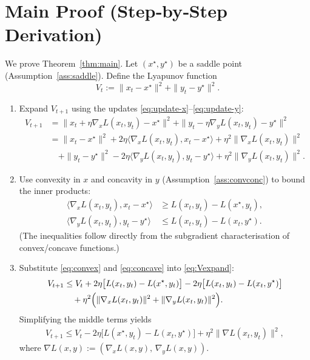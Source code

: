 \documentclass[11pt]{article}
\begin{document}
\section*{Main Proof (Step‑by‑Step Derivation)}
We prove Theorem~\ref{thm:main}. Let $(x^{\star},y^{\star})$ be a saddle point (Assumption~\ref{ass:saddle}). Define the Lyapunov function
\[
V_{t}:=\|x_{t}-x^{\star}\|^{2}+\|y_{t}-y^{\star}\|^{2}.
\]

\begin{enumerate}
\item[Step 1.] Expand $V_{t+1}$ using the updates \eqref{eq:update-x}–\eqref{eq:update-y}:
\begin{align}
V_{t+1}&=\|x_{t}+\eta\nabla_{x}L(x_{t},y_{t})-x^{\star}\|^{2}
        +\|y_{t}-\eta\nabla_{y}L(x_{t},y_{t})-y^{\star}\|^{2}\nonumber\\
&= \|x_{t}-x^{\star}\|^{2}+2\eta\langle \nabla_{x}L(x_{t},y_{t}),x_{t}-x^{\star}\rangle
   +\eta^{2}\|\nabla_{x}L(x_{t},y_{t})\|^{2}\nonumber\\
&\quad +\|y_{t}-y^{\star}\|^{2}
   -2\eta\langle \nabla_{y}L(x_{t},y_{t}),y_{t}-y^{\star}\rangle
   +\eta^{2}\|\nabla_{y}L(x_{t},y_{t})\|^{2}. \label{eq:Vexpand}
\end{align}

\item[Step 2.] Use convexity in $x$ and concavity in $y$ (Assumption~\ref{ass:convconc}) to bound the inner products:
\begin{align}
\langle \nabla_{x}L(x_{t},y_{t}),x_{t}-x^{\star}\rangle
   &\ge L(x_{t},y_{t})-L(x^{\star},y_{t}), \label{eq:convex}\\
\langle \nabla_{y}L(x_{t},y_{t}),y_{t}-y^{\star}\rangle
   &\le L(x_{t},y_{t})-L(x_{t},y^{\star}). \label{eq:concave}
\end{align}
(The inequalities follow directly from the subgradient characterisation of convex/concave functions.)

\item[Step 3.] Substitute \eqref{eq:convex} and \eqref{eq:concave} into \eqref{eq:Vexpand}:
\begin{align}
V_{t+1}&\le V_{t}
   +2\eta\bigl[L(x_{t},y_{t})-L(x^{\star},y_{t})\bigr]
   -2\eta\bigl[L(x_{t},y_{t})-L(x_{t},y^{\star})\bigr]\nonumber\\
&\quad +\eta^{2}\Bigl(\|\nabla_{x}L(x_{t},y_{t})\|^{2}
   +\|\nabla_{y}L(x_{t},y_{t})\|^{2}\Bigr).\label{eq:Vmid}
\end{align}
Simplifying the middle terms yields
\begin{align}
V_{t+1}\le V_{t}
   -2\eta\bigl[L(x^{\star},y_{t})-L(x_{t},y^{\star})\bigr]
   +\eta^{2}\|\nabla L(x_{t},y_{t})\|^{2},\label{eq:Vmid2}
\end{align}
where $\nabla L(x,y):=(\nabla_{x}L(x,y),\,\nabla_{y}L(x,y))$.


\end{enumerate}
\end{document}
